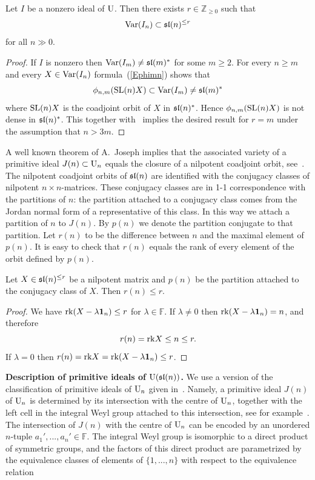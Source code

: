 \documentclass[10pt]{amsart}\oddsidemargin -1mm \evensidemargin -1mm \topmargin -15mm\headheight5mm \headsep 3.5mm \textheight 245mm\textwidth 170mm %
\begin{document}
\begin{lemma}\label{Lrk17}Let $I$ be a nonzero ideal of $\operatorname{\mathrm{U}}$. Then there exists $r\in\mathbb Z_{\ge0}$ such that $$\operatorname{\mathrm{Var}}(I_n)\subset\frak{sl}(n)^{\le r}$$ for all $n\gg0$.\end{lemma}
\begin{proof}If $I$ is nonzero then $\operatorname{\mathrm{Var}}(I_m)\ne\frak{sl}(m)^*$ for some $m\ge 2$. For every $n\ge m$ and every $X\in\operatorname{\mathrm{Var}}(I_n)$ formula~(\ref{Ephimn}) shows that
$$\phi_{n, m}({\rm SL}(n)X)\subset \operatorname{\mathrm{Var}}(I_m)\ne\frak{sl}(m)^*$$
where ${\rm SL}(n)X$ is the coadjoint orbit of $X$ in $\frak{sl}(n)^*$. Hence $\phi_{n, m}({\rm SL}(n)X)$ is not dense in $\frak{sl}(n)^*$. This together with~\cite[Lemma~4.12]{PP1} implies the desired result for $r=m$ under the assumption that $n>3m$.
\end{proof}
A well known theorem of A.~Joseph implies that the associated variety of a primitive ideal $J(n)\subset\operatorname{\mathrm{U}}_n$ equals the closure of a nilpotent coadjoint orbit, see~\cite{Jo}. The  nilpotent coadjoint orbits of $\frak{sl}(n)$ are identified with the conjugacy classes of nilpotent $n\times n$-matrices. These conjugacy classes are in 1-1 correspondence with the partitions of $n$: the partition attached to a conjugacy class comes from the Jordan normal form of a representative of this class. In this way we attach a partition of $n$ to $J(n)$. 
By $p(n)$ we denote the partition conjugate to that partition. Let $r(n)$ to be the difference between $n$ and the maximal element of $p(n)$. It is easy to check that $r(n)$ equals the rank of every element of the orbit defined by $p(n)$. 
\begin{lemma}\label{Lslnrx}Let $X\in\frak{sl}(n)^{\le r}$ be a nilpotent matrix and $p(n)$ be the partition attached to the conjugacy class of $X$. Then $r(n)\le r$.\end{lemma}
\begin{proof} We have ${\rm rk}(X-\lambda{\bf 1}_n)\le r$ for $\lambda\in\mathbb F$. If $\lambda\ne0$ then ${\rm rk}(X-\lambda{\bf 1}_n)=n$, and therefore $$r(n)={\rm rk}X\le n\le r.$$ If $\lambda=0$ then $r(n)={\rm rk}X={\rm rk}(X-\lambda{\bf 1}_n)\le r$.\end{proof}
{\bf Description of primitive ideals of $\operatorname{\mathrm{U}}(\frak{sl}(n))$.} We use a version of the classification of primitive ideals of $\operatorname{\mathrm{U}}_n$ given in~\cite{PP2}. Namely, a primitive ideal $J(n)$ of $\operatorname{\mathrm{U}}_n$ is determined by its intersection with the centre of $\operatorname{\mathrm{U}}_n$, together with the left cell in the integral Weyl group attached to this intersection, see for example~\cite[Section 6]{LO}. The intersection of $J(n)$ with the centre of $\operatorname{\mathrm{U}}_n$ can be encoded by an unordered $n$-tuple $a_1',..., a_n'\in \mathbb F$. The integral Weyl group is isomorphic to a direct product of symmetric groups, and the factors of this direct product are parametrized by the equivalence classes of elements of $\{1,..., n\}$ with respect to the equivalence relation
\end{document}
